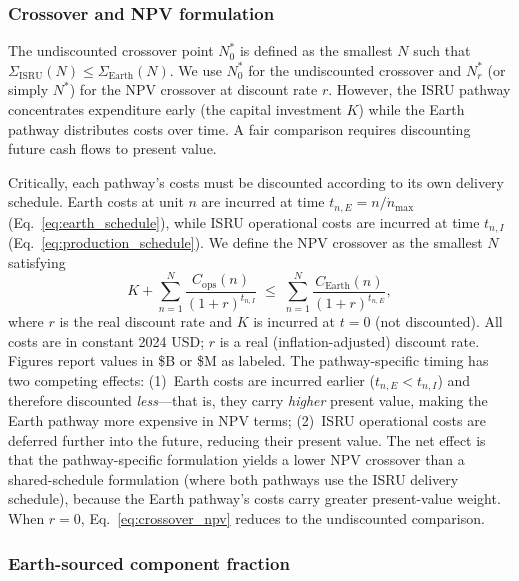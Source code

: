 \documentclass[preprint,12pt]{elsarticle}
\begin{document}
\subsubsection{Crossover and NPV formulation}

The undiscounted crossover point $N^*_0$ is defined as the smallest $N$ such that $\Sigma_{\mathrm{ISRU}}(N) \leq \Sigma_{\mathrm{Earth}}(N)$. We use $N^*_0$ for the undiscounted crossover and $N^*_r$ (or simply $N^*$) for the NPV crossover at discount rate $r$. However, the ISRU pathway concentrates expenditure early (the capital investment $K$) while the Earth pathway distributes costs over time. A fair comparison requires discounting future cash flows to present value.

Critically, each pathway's costs must be discounted according to its own delivery schedule. Earth costs at unit $n$ are incurred at time $t_{n,E} = n/\dot{n}_{\max}$ (Eq.~\ref{eq:earth_schedule}), while ISRU operational costs are incurred at time $t_{n,I}$ (Eq.~\ref{eq:production_schedule}). We define the NPV crossover as the smallest $N$ satisfying
\begin{equation}
  K + \sum_{n=1}^{N} \frac{C_{\mathrm{ops}}(n)}{(1+r)^{t_{n,I}}} \;\leq\; \sum_{n=1}^{N} \frac{C_{\mathrm{Earth}}(n)}{(1+r)^{t_{n,E}}},
  \label{eq:crossover_npv}
\end{equation}
where $r$ is the real discount rate and $K$ is incurred at $t = 0$ (not discounted). All costs are in constant 2024 USD; $r$ is a real (inflation-adjusted) discount rate. Figures report values in \$B or \$M as labeled. The pathway-specific timing has two competing effects: (1)~Earth costs are incurred earlier ($t_{n,E} < t_{n,I}$) and therefore discounted \emph{less}---that is, they carry \emph{higher} present value, making the Earth pathway more expensive in NPV terms; (2)~ISRU operational costs are deferred further into the future, reducing their present value. The net effect is that the pathway-specific formulation yields a lower NPV crossover than a shared-schedule formulation (where both pathways use the ISRU delivery schedule), because the Earth pathway's costs carry greater present-value weight. When $r = 0$, Eq.~\ref{eq:crossover_npv} reduces to the undiscounted comparison.

\subsubsection{Earth-sourced component fraction}
\label{sec:vitamin}
\end{document}

